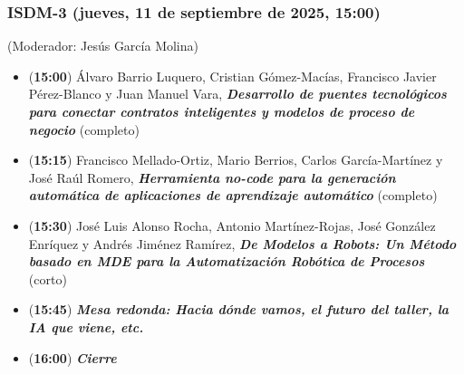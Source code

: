 \begin{frame}
  \frametitle{ISDM-3 (jueves, 11 de septiembre de 2025, 15:00)}
{\small (Moderador: Jesús García Molina)}
\begin{itemize}

  \item ({\bf 15:00}) Álvaro Barrio Luquero, Cristian Gómez-Macías, Francisco Javier Pérez-Blanco y Juan Manuel Vara, %
        {\bfseries\itshape Desarrollo de puentes tecnológicos para conectar contratos inteligentes y modelos de proceso de negocio} %
        (completo)

  \item ({\bf 15:15}) Francisco Mellado-Ortiz, Mario Berrios, Carlos García-Martínez y José Raúl Romero, %
        {\bfseries\itshape Herramienta no-code para la generación automática de aplicaciones de aprendizaje automático} %
        (completo)

  \item ({\bf 15:30}) José Luis Alonso Rocha, Antonio Martínez-Rojas, José González Enríquez y Andrés Jiménez Ramírez, %
        {\bfseries\itshape De Modelos a Robots: Un Método basado en MDE para la Automatización Robótica de Procesos} %
        (corto)

  \item ({\bf 15:45}) {\bfseries\itshape Mesa redonda: Hacia dónde vamos, el futuro del taller, la IA que viene, etc.}

  \item ({\bf 16:00}) {\bfseries\itshape Cierre}

\end{itemize}
\end{frame}
